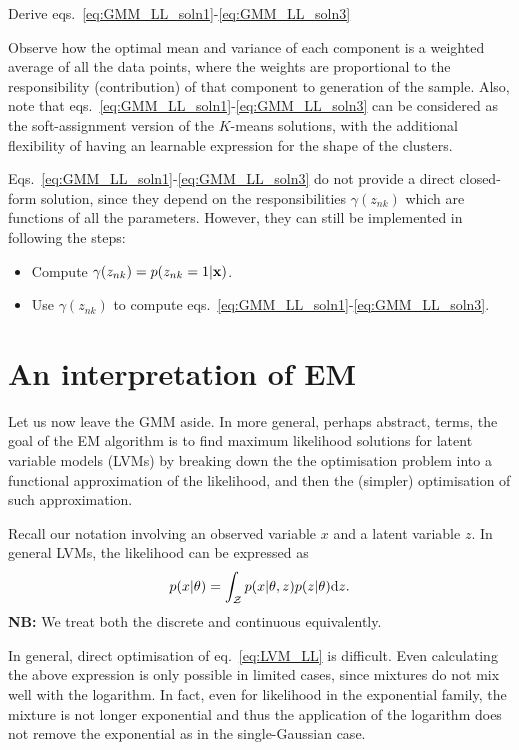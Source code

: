 \begin{exercise}
    Derive eqs.~\eqref{eq:GMM_LL_soln1}-\eqref{eq:GMM_LL_soln3}
\end{exercise}

\begin{remark}
    Observe how the optimal mean and variance of each component is a weighted average of all the data points, where the weights are proportional to the responsibility (contribution) of that component to generation of the sample. Also, note that eqs.~\eqref{eq:GMM_LL_soln1}-\eqref{eq:GMM_LL_soln3} can be considered as the soft-assignment version of the $K$-means solutions, with the additional flexibility of having an learnable expression for the shape of the clusters.  
\end{remark}

Eqs.~\eqref{eq:GMM_LL_soln1}-\eqref{eq:GMM_LL_soln3} do not provide a direct closed-form solution, since they depend on the responsibilities $\gamma(z_{nk})$ which are functions of all the parameters. However, they can still be implemented in following the steps: 
\begin{itemize}
    \item[(E)] Compute $\gamma(z_{nk}) = p(z_{nk}=1|{ \mathbf{x}})$.
    \item[(M)] Use $\gamma(z_{nk})$ to compute eqs.~\eqref{eq:GMM_LL_soln1}-\eqref{eq:GMM_LL_soln3}. 
\end{itemize}


\section{An interpretation of EM}

Let us now leave the GMM aside. In more general, perhaps abstract, terms, the goal of the  EM algorithm is to find maximum likelihood solutions for latent variable models (LVMs) by breaking down the the optimisation problem into a functional approximation of the likelihood, and then the (simpler) optimisation of such approximation. 

Recall our notation involving an observed variable $x$ and a latent variable $z$. In general LVMs, the likelihood can be expressed as 
\begin{equation}
    p(x|\theta) = \int_{\mathcal Z} p(x|\theta,z)p(z|\theta){\text{d}z}. \label{eq:LVM_LL}
\end{equation}
\textbf{NB:} We treat both the discrete and continuous equivalently.

In general, direct optimisation of eq.~\eqref{eq:LVM_LL} is difficult. Even calculating the above expression is only possible in limited cases, since mixtures do not mix well with the logarithm. In fact, even for likelihood in the exponential family, the mixture is not longer exponential and thus the application of the logarithm does not remove the exponential as in the single-Gaussian case.  

